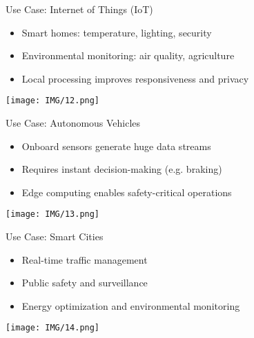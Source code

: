 \documentclass{beamer}
\begin{document}
\begin{frame}{Use Case: Internet of Things (IoT)}
  \begin{itemize}
    \item Smart homes: temperature, lighting, security
    \item Environmental monitoring: air quality, agriculture
    \item Local processing improves responsiveness and privacy
  \end{itemize}
  \vspace{0.5cm}
  \centering
  \texttt{[image: IMG/12.png]} %
\end{frame}

\begin{frame}{Use Case: Autonomous Vehicles}
  \begin{itemize}
    \item Onboard sensors generate huge data streams
    \item Requires instant decision-making (e.g. braking)
    \item Edge computing enables safety-critical operations
  \end{itemize}
  \vspace{0.5cm}
  \centering
  \texttt{[image: IMG/13.png]} %
\end{frame}

\begin{frame}{Use Case: Smart Cities}
  \begin{itemize}
    \item Real-time traffic management
    \item Public safety and surveillance
    \item Energy optimization and environmental monitoring
  \end{itemize}
  \vspace{0.5cm}
  \centering
  \texttt{[image: IMG/14.png]} %
\end{frame}
\end{document}
